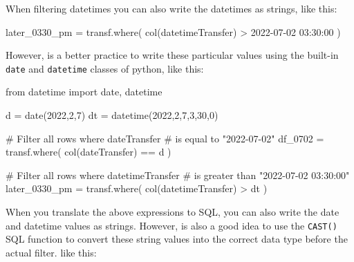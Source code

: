 \documentclass[
  11pt,
  letterpaper,
  DIV=11,
  numbers=noendperiod]{scrreprt}
\newenvironment{Shaded}{\begin{snugshade}}{\end{snugshade}}
\newcommand{\CommentTok}[1]{\textcolor[rgb]{0.37,0.37,0.37}{#1}}
\newcommand{\DecValTok}[1]{\textcolor[rgb]{0.68,0.00,0.00}{#1}}
\newcommand{\ImportTok}[1]{\textcolor[rgb]{0.00,0.46,0.62}{#1}}
\newcommand{\NormalTok}[1]{\textcolor[rgb]{0.00,0.23,0.31}{#1}}
\newcommand{\OperatorTok}[1]{\textcolor[rgb]{0.37,0.37,0.37}{#1}}
\newcommand{\StringTok}[1]{\textcolor[rgb]{0.13,0.47,0.30}{#1}}
\begin{document}
When filtering datetimes you can also write the datetimes as strings,
like this:

\begin{Shaded}
\begin{Highlighting}[]
\NormalTok{later\_0330\_pm }\OperatorTok{=}\NormalTok{ transf.where(}
\NormalTok{    col(}\StringTok{\textquotesingle{}datetimeTransfer\textquotesingle{}}\NormalTok{) }\OperatorTok{\textgreater{}} \StringTok{\textquotesingle{}2022{-}07{-}02 03:30:00\textquotesingle{}}
\NormalTok{)}
\end{Highlighting}
\end{Shaded}

However, is a better practice to write these particular values using the
built-in \texttt{date} and \texttt{datetime} classes of python, like
this:

\begin{Shaded}
\begin{Highlighting}[]
\ImportTok{from}\NormalTok{ datetime }\ImportTok{import}\NormalTok{ date, datetime}

\NormalTok{d }\OperatorTok{=}\NormalTok{ date(}\DecValTok{2022}\NormalTok{,}\DecValTok{2}\NormalTok{,}\DecValTok{7}\NormalTok{)}
\NormalTok{dt }\OperatorTok{=}\NormalTok{ datetime(}\DecValTok{2022}\NormalTok{,}\DecValTok{2}\NormalTok{,}\DecValTok{7}\NormalTok{,}\DecValTok{3}\NormalTok{,}\DecValTok{30}\NormalTok{,}\DecValTok{0}\NormalTok{)}

\CommentTok{\# Filter all rows where \textasciigrave{}dateTransfer\textasciigrave{}}
\CommentTok{\# is equal to "2022{-}07{-}02"}
\NormalTok{df\_0702 }\OperatorTok{=}\NormalTok{ transf.where(}
\NormalTok{    col(}\StringTok{\textquotesingle{}dateTransfer\textquotesingle{}}\NormalTok{) }\OperatorTok{==}\NormalTok{ d}
\NormalTok{)}

\CommentTok{\# Filter all rows where \textasciigrave{}datetimeTransfer\textasciigrave{}}
\CommentTok{\# is greater than "2022{-}07{-}02 03:30:00"}
\NormalTok{later\_0330\_pm }\OperatorTok{=}\NormalTok{ transf.where(}
\NormalTok{    col(}\StringTok{\textquotesingle{}datetimeTransfer\textquotesingle{}}\NormalTok{) }\OperatorTok{\textgreater{}}\NormalTok{ dt}
\NormalTok{)}
\end{Highlighting}
\end{Shaded}

When you translate the above expressions to SQL, you can also write the
date and datetime values as strings. However, is also a good idea to use
the \texttt{CAST()} SQL function to convert these string values into the
correct data type before the actual filter. like this:
\end{document}
